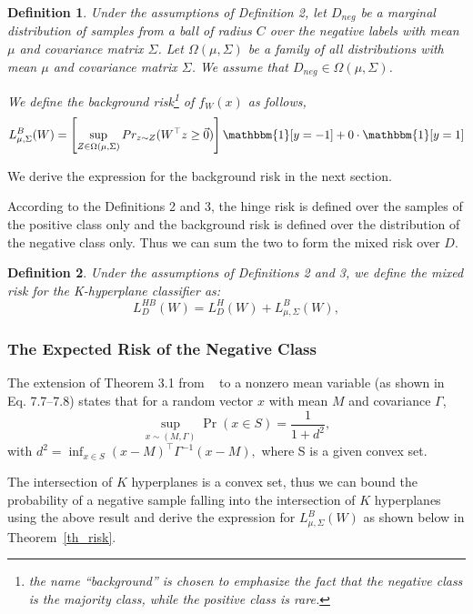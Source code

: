\documentclass[twoside,11pt]{article}
\newtheorem{mydef}{Definition}
\begin{document}
\begin{mydef}
Under the assumptions of Definition 2, let $D_{neg}$ be a marginal distribution of samples from a ball of radius $C$ over the negative labels  with mean $\mu$ and covariance matrix $\Sigma$.  Let $\Omega(\mu,\Sigma)$ be a family of all distributions with mean $\mu$ and covariance matrix $\Sigma$. We assume that $D_{neg}\in \Omega(\mu,\Sigma)$.

We define the \emph{background risk}\footnote{the name ``background'' is chosen to emphasize the fact that the negative class is the majority class, while the positive class is rare.} of  $f_W(x)$ as follows,
\begin{equation}
L^{B}_{\mu,\Sigma}(W)=\left[\sup_{Z\in\Omega(\mu, \Sigma)}Pr_{z\sim Z}(W^\top z\geq\vec{0})\right]\mathbbm{1}[y=-1]+0\cdot \mathbbm{1}[y=1]
\end{equation}
\end{mydef}
We derive the expression for the background risk in the next section.

According to the Definitions 2 and 3, the hinge risk is defined over the samples of the positive class only and the background risk is defined over the distribution of the negative class only. Thus we can sum the two to form the mixed risk over $D$.

\begin{mydef} Under the assumptions of Definitions 2 and 3,
we define the mixed risk for the K-hyperplane classifier as:
\begin{equation}\label{eq_risk}
L^{HB}_D(W)=L_D^{H}(W)+L^{B}_{\mu,\Sigma}(W),
\end{equation}
\end{mydef}


\subsubsection{The Expected Risk of the Negative Class}\label{subsection_k_minimax_risk}

The extension of Theorem 3.1 from ~\cite{marshall1960} to a nonzero mean variable (as shown in ~\cite{marshall1960} Eq. 7.7--7.8) states that for a random vector $x$ with mean $M$ and covariance $\Gamma$,
\[
\sup_{x\sim (M, \Gamma)}\Pr(x\in S)=\frac{1}{1+d^2},
\]  with $d^2=\inf_{x\in S}(x-M)^\top  \Gamma^{-1}(x-M),$
where S is a given convex set.

The intersection of $K$ hyperplanes is a convex set, thus we can bound the probability of a negative sample falling into the intersection of $K$ hyperplanes using the above result and derive the expression for $L^{B}_{\mu,\Sigma}(W)$ as shown below in Theorem~\ref{th_risk}.
\end{document}
